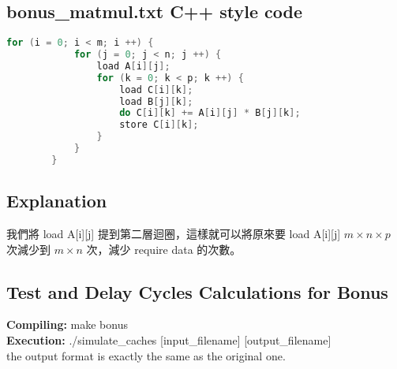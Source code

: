 \documentclass[12pt, a4paper]{article}
\begin{document}
\begin{CJK*}{UTF8}{bsmi}
        \subsection{bonus\_matmul.txt C++ style code}
        \begin{lstlisting}[language=C++]
        for (i = 0; i < m; i ++) {
            for (j = 0; j < n; j ++) {
                load A[i][j];
                for (k = 0; k < p; k ++) {
                    load C[i][k];
                    load B[j][k];
                    do C[i][k] += A[i][j] * B[j][k];
                    store C[i][k];
                }
            }
        }
        \end{lstlisting}

        \newpage
        \subsection{Explanation}
            我們將 load A[i][j] 提到第二層迴圈，這樣就可以將原來要 load A[i][j] $m \times n \times p$ 次減少到 $m \times n$ 次，減少 require data 的次數。
        \subsection{Test and Delay Cycles Calculations for Bonus}
            \textbf{Compiling:} make bonus \\
            \textbf{Execution:} ./simulate\_caches [input\_filename] [output\_filename] \\
            the output format is exactly the same as the original one. \\

    \end{CJK*}
\end{document}
